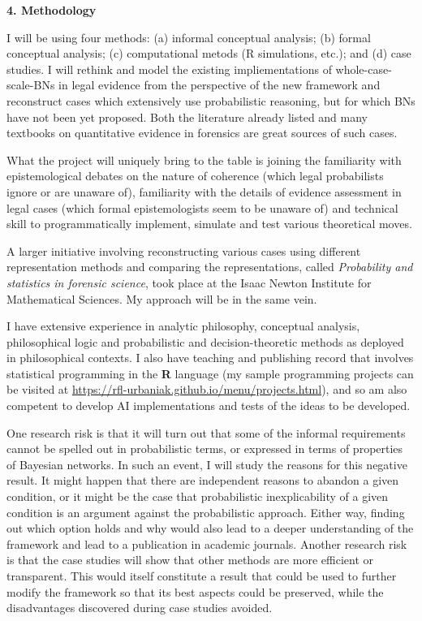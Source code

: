 \documentclass[11pt,dvipsnames,enabledeprecatedfontcommands]{scrartcl}
\begin{document}
\noindent \large \textbf{4. Methodology}

\vspace{1mm} \normalsize

I will be using four methods: (a) informal conceptual analysis; (b)
formal conceptual analysis; (c) computational metods (R simulations,
etc.); and (d) case studies. I will rethink and model the existing
impliementations of whole-case-scale-BNs in legal evidence from the
perspective of the new framework and reconstruct cases which extensively
use probabilistic reasoning, but for which BNs have not been yet
proposed. Both the literature already listed and many textbooks on
quantitative evidence in forensics are great sources of such cases.

What the project will uniquely bring to the table is joining the
familiarity with epistemological debates on the nature of coherence
(which legal probabilists ignore or are unaware of), familiarity with
the details of evidence assessment in legal cases (which formal
epistemologists seem to be unaware of) and technical skill to
programmatically implement, simulate and test various theoretical moves.

A larger initiative involving reconstructing various cases using
different representation methods and comparing the representations,
called \emph{Probability and statistics in forensic science}, took place
at the Isaac Newton Institute for Mathematical Sciences. My approach
will be in the same vein.

I have extensive experience in analytic philosophy, conceptual analysis,
philosophical logic and probabilistic and decision-theoretic methods as
deployed in philosophical contexts. I also have teaching and publishing
record that involves statistical programming in the \textsf{\textbf{R}}
language (my sample programming projects can be visited at
\url{https://rfl-urbaniak.github.io/menu/projects.html}), and so am also
competent to develop AI implementations and tests of the ideas to be
developed.

One research risk is that it will turn out that some of the informal
requirements cannot be spelled out in probabilistic terms, or expressed
in terms of properties of Bayesian networks. In such an event, I will
study the reasons for this negative result. It might happen that there
are independent reasons to abandon a given condition, or it might be the
case that probabilistic inexplicability of a given condition is an
argument against the probabilistic approach. Either way, finding out
which option holds and why would also lead to a deeper understanding of
the framework and lead to a publication in academic journals. Another
research risk is that the case studies will show that other methods are
more efficient or transparent. This would itself constitute a result
that could be used to further modify the framework so that its best
aspects could be preserved, while the disadvantages discovered during
case studies avoided.
\end{document}
